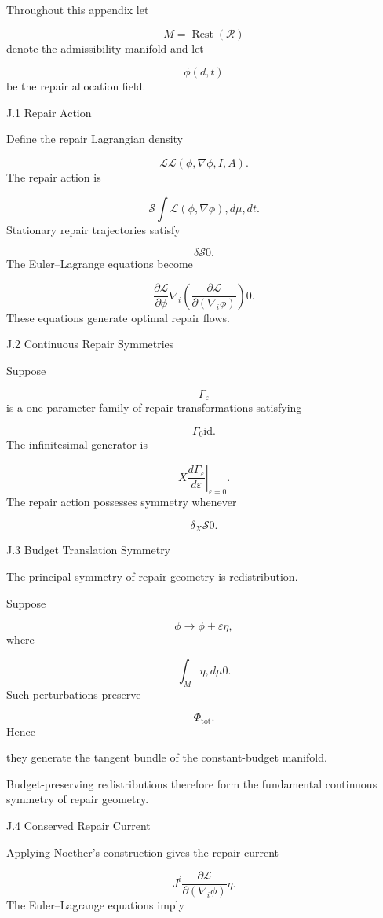 \documentclass[12pt,oneside]{article}
\theoremstyle{plain}
\theoremstyle{definition}
\theoremstyle{remark}
\DeclareMathOperator{\Rest}{Rest}
\begin{document}
Throughout this appendix let

\[
M=\Rest(\mathcal R)
\]
denote the admissibility manifold and let

\[
\phi(d,t)
\]
be the repair allocation field.


J.1 Repair Action

Define the repair Lagrangian density

\[
\mathcal L
\mathcal L
(
\phi,
\nabla\phi,
I,
A
).
\]
The repair action is

\[
\mathcal S
\int
\mathcal L
(\phi,\nabla\phi)
,d\mu,dt.
\]
Stationary repair trajectories satisfy

\[
\delta\mathcal S
0. 
\]
The Euler–Lagrange equations become

\[
\frac{\partial\mathcal L}
{\partial\phi}
\nabla_i
\left(
\frac{\partial\mathcal L}
{\partial(\nabla_i\phi)}
\right)
0. 
\]
These equations generate optimal repair flows.


J.2 Continuous Repair Symmetries

Suppose

\[
\Gamma_\varepsilon
\]
is a one-parameter family of repair transformations satisfying

\[
\Gamma_0
\mathrm{id}.
\]
The infinitesimal generator is

\[
X
\left.
\frac{d\Gamma_\varepsilon}
{d\varepsilon}
\right|_{\varepsilon=0}.
\]
The repair action possesses symmetry whenever

\[
\delta_X
\mathcal S
0. 
\]

J.3 Budget Translation Symmetry

The principal symmetry of repair geometry is redistribution.

Suppose

\[
\phi
\rightarrow
\phi+\varepsilon\eta,
\]
where

\[
\int_M
\eta
,d\mu
0. 
\]
Such perturbations preserve

\[
\Phi_{\mathrm{tot}}.
\]
Hence

they generate the tangent bundle of the constant-budget manifold.

Budget-preserving redistributions therefore form the fundamental continuous symmetry of repair geometry.


J.4 Conserved Repair Current

Applying Noether's construction gives the repair current

\[
J^i
\frac{\partial\mathcal L}
{\partial(\nabla_i\phi)}
\eta.
\]
The Euler–Lagrange equations imply
\end{document}
